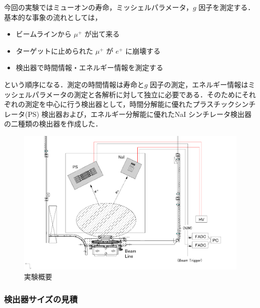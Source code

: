 今回の実験ではミューオンの寿命，ミッシェルパラメータ，$g$ 因子を測定する．基本的な事象の流れとしては，
\begin{itemize}
\item ビームラインから $\mu ^{+}$ が出て来る
\item ターゲットに止められた $\mu ^{+}$ が $e^{+}$ に崩壊する
\item 検出器で時間情報・エネルギー情報を測定する
\end{itemize}
という順序になる．測定の時間情報は寿命と$g$ 因子の測定，エネルギー情報はミッシェルパラメータの測定と各解析に対して独立に必要である．そのためにそれぞれの測定を中心に行う検出器として，時間分解能に優れたプラスチックシンチレータ(PS) 検出器および，エネルギー分解能に優れたNaI シンチレータ検出器の二種類の検出器を作成した．    
\begin{figure}[H]
\centering
\includegraphics[width=1\textwidth]{figure/hayakawa/lifetime.png}
\caption{実験概要}
\end{figure}

\subsubsection{検出器サイズの見積}

